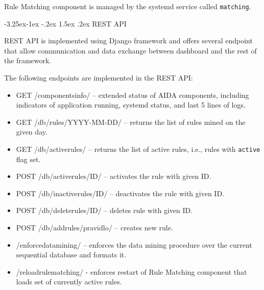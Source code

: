 \documentclass[a4paper]{article} %
\makeatletter
\renewcommand\subsection{\@startsection{subsection}{2}{\z@}%
                   {-3.25ex\@plus -1ex \@minus -.2ex}%
                   {1.5ex \@plus .2ex}%
                   {\normalfont\sffamily\large\bfseries\color{projectcolor}}}
\makeatother
\begin{document}
Rule Matching component is managed by the systemd service called \texttt{matching}.

% 

\subsection{REST API}

REST API is implemented using Django framework and offers several endpoint that allow communication and data exchange between dashboard and the rest of the framework. 

The following endpoints are implemented in the REST API:
\begin{itemize}[nolistsep,noitemsep]
  \item GET /componentsinfo/ -- extended status of AIDA components, including indicators of application running, systemd status, and last 5 lines of logs.
  \item GET /db/rules/YYYY-MM-DD/ -- returns the list of rules mined on the given day.
  \item GET /db/activerules/ -- returns the list of active rules, i.e., rules with \texttt{active} flag set.
  \item POST /db/activerules/ID/ -- activates the rule with given ID.
  \item POST /db/inactiverules/ID/ -- deactivates the rule with given ID.
  \item POST /db/deleterules/ID/ -- deletes rule with given ID.
  \item POST /db/addrules/pravidlo/ -- creates new rule.
  \item /enforcedatamining/ -- enforces the data mining procedure over the current sequential database and formats it.
  \item /reloadrulematching/ - enforces restart of Rule Matching component that loads set of currently active rules.
\end{itemize}


% 
\end{document}
